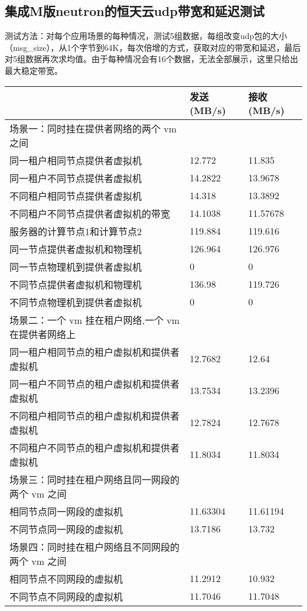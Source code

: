 \documentclass[a4paper,left=1.5cm,right=1.5cm,11pt]{article}
\begin{document}
\subsection{集成M版neutron的恒天云udp带宽和延迟测试}
测试方法：对每个应用场景的每种情况，测试5组数据，每组改变udp包的大小（msg\_size），从1个字节到64K，每次倍增的方式，获取对应的带宽和延迟，最后对5组数据再次求均值。由于每种情况会有16个数据，无法全部展示，这里只给出最大稳定带宽。
\begin{center}
\begin{tabular}[c]{|l|l|l|}
\hline
 &发送(MB/s) &接收(MB/s)\\
\hline
 场景一：同时挂在提供者网络的两个 vm 之间 &  & \\
\hline
 同一租户相同节点提供者虚拟机 & 12.772&11.835  \\
\hline
 同一租户不同节点提供者虚拟机 & 14.2822&13.9678  \\
 \hline
 不同租户相同节点提供者虚拟机& 14.318&13.3892  \\
 \hline
 不同租户不同节点提供者虚拟机的带宽&14.1038 &11.57678 \\
 \hline
 服务器的计算节点1和计算节点2&119.884 &119.616  \\
 \hline
 同一节点提供者虚拟机和物理机&126.964 &126.976  \\
 \hline
 同一节点物理机到提供者虚拟机&0 &0  \\
 \hline
 不同节点提供者虚拟机和物理机&136.98 &119.726  \\
 \hline
 不同节点物理机到提供者虚拟机&0 &0  \\
 \hline
 \hline
 场景二：一个 vm 挂在租户网络,一个 vm 在提供者网络上& & \\
 \hline
 同一租户相同节点的租户虚拟机和提供者虚拟机&12.7682 &12.64  \\
 \hline
 同一租户不同节点的租户虚拟机和提供者虚拟机&13.7534 &13.2396 \\
 \hline
 不同租户相同节点的租户虚拟机和提供者虚拟机&12.7824 &12.7678  \\
 \hline
 不同租户不同节点的租户虚拟机和提供者虚拟机&11.8034 &11.8034  \\
 \hline
 \hline
 场景三：同时挂在租户网络且同一网段的两个 vm 之间& & \\
 \hline
 相同节点同一网段的虚拟机& 11.63304 &11.61194 \\
 \hline
 不同节点同一网段的虚拟机&  13.7186 &13.732 \\
 \hline
 \hline
 场景四：同时挂在租户网络且不同网段的两个 vm 之间& &\\
 \hline
 相同节点不同网段的虚拟机&11.2912  &10.932 \\
 \hline
 不同节点不同网段的虚拟机&11.7046  &11.7048 \\

\hline
\end{tabular}
\end{center}
\end{document}
